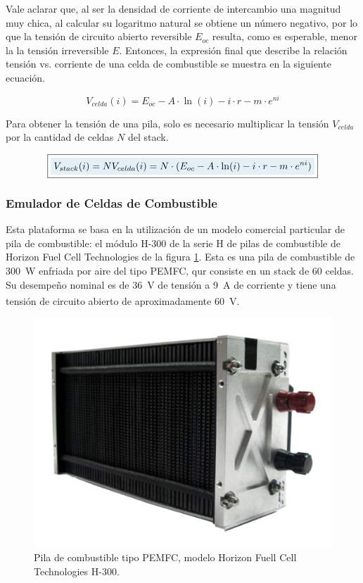 Vale aclarar que, al ser la densidad de corriente de intercambio una magnitud muy chica, al calcular su logaritmo natural se obtiene un número negativo, por lo que la tensión de circuito abierto reversible $E_{oc}$ resulta, como es esperable, menor la la tensión irreversible $E$. Entonces, la expresión final que describe la relación tensión vs. corriente de una celda de combustible se muestra en la siguiente ecuación.

\begin{equation}\label{v_celda}
    V_{celda}(i) = E_{oc} - A\cdot\ln(i) - i\cdot r - m\cdot e^{ni}
\end{equation}

Para obtener la tensión de una pila, solo es necesario multiplicar la tensión $V_{celda}$ por la cantidad de celdas $N$ del stack.

\begin{equation}\label{v_stack}
    \boxed{
    \highlight{V_{stack}(i) = NV_{celda}(i) = N\cdot (E_{oc} - A\cdot\ln(i) - i\cdot r - m\cdot e^{ni})}
    }
\end{equation}

\subsubsection{Emulador de Celdas de Combustible}

Esta plataforma se basa en la utilización de un modelo comercial particular de pila de combustible: el módulo H-300 de la serie H de pilas de combustible de Horizon Fuel Cell Technologies de la figura \ref{H300}. Esta es una pila de combustible de \SI[]{300}[]{\watt} enfriada por aire del tipo PEMFC, qur consiste en un stack de \num{60} celdas. Su desempeño nominal es de \SI[]{36}[]{\volt} de tensión a \SI[]{9}[]{\ampere} de corriente y tiene una tensión de circuito abierto de aproximadamente \SI[]{60}[]{\volt}.\textsuperscript{\cite{HSeriesBrochure}}\\

\begin{figure}[h]
    \centering
    \includegraphics[scale=0.4]{Imagenes/Horizon H-300.png}
    \caption{Pila de combustible tipo PEMFC, modelo Horizon Fuell Cell Technologies H-300.}
    \label{H300}
\end{figure}


